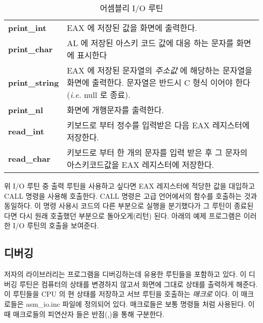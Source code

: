 \begin{AsmCodeListing}[frame=none, numbers=none]
\end{AsmCodeListing}

\begin{table}[t]
\centering
\begin{tabular}{lp{3.5in}}
{\bf print\_int} & EAX 에 저장된 값을 화면에 출력한다.  
                   \\
{\bf print\_char} & AL 에 저장된 아스키 코드 값에 대응
                    하는 문자를 화면에 표시한다 \\
{\bf print\_string} & EAX 에 저장된 문자열의 {\em 주소값} 에 해당하는
                     문자열을 화면에 출력한다. 문자열은 반드시 C 형식
                     이어야 한다({\em i.e.} null 로 종료). \\
{\bf print\_nl} & 화면에 개행문자를 출력한다. \\
{\bf read\_int} & 키보드로 부터 정수를 입력받은 다음 EAX 
                 레지스터에 저장한다. \\
{\bf read\_char} & 키보드로 부터 한 개의 문자를 입력 받은 후
                  그 문자의 아스키코드값을 EAX 레지스터에 저장한다. \\
\end{tabular}
\caption{어셈블리 I/O 루틴 \label{tab:asmio} 
  
 
}
\end{table}

위 I/O 루틴 중 출력 루틴을 사용하고 싶다면 EAX 레지스터에 적당한 값을 대입하고 {\code CALL} 명령을 사용해 호출한다. {\code CALL} 명령은 고급 언어에서의
함수를 호출하는 것과 동일하다. 이 명령 사용시 코드의 다른 부분으로 실행을 분기했다가 그 루틴이 종료된다면 다시 원래 호출했던 부분으로 돌아오게(리턴)
된다. 아래의 예제 프로그램은 이러한 I/O 루틴의 호출을 보여준다. 

\subsection{디버깅}
저자의 라이브러리는 프로그램을 디버깅하는데 유용한 루틴들을 포함하고 있다. 이 디버깅 루틴은 컴퓨터의 상태를 변경하지 않고서 화면에 그대로 상태를 
출력하게 해준다. 이 루틴들을 CPU 의 현 상태를 저장하고 서브 루틴을 호출하는 \emph{매크로} 이다. 이 매크로들은 {\code asm\_io.inc} 파일에 정의되어 
있다. 매크로들은 보통 명령들 처럼 사용된다. 이 때 매크로들의 피연산자 들은 반점(,)을 통해 구분한다. 


